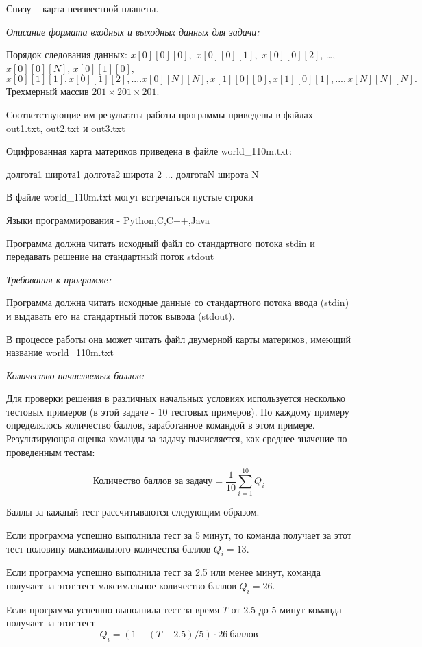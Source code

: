 Снизу -- карта неизвестной планеты.
 
\textit{Описание формата входных и выходных данных для задачи:}

Порядок следования данных: $x[0][0][0],$ $x[0][0][1],$ $x[0][0][2]$, \dots , $x[0][0][N]$, $x[0][1][0],$ \linebreak $x[0][1][1], x[0][1][2], .... x[0][N][N], x[1][0][0], x[1][0][1], ... , x[N][N][N].$ Трехмерный массив $201\times 201\times 201$.

Соответствующие им результаты работы программы приведены в файлах out1.txt, out2.txt и out3.txt

Оцифрованная карта материков приведена в файле world\_110m.txt:

долгота1 широта1
долгота2 широта 2
...
долготаN широта N

В файле world\_110m.txt могут встречаться пустые строки

Языки программирования - Python,C,C++,Java

Программа должна читать исходный файл со стандартного потока stdin и передавать решение на стандартный поток stdout

\textit{Требования к программе:}

    Программа должна читать исходные данные со стандартного потока ввода (stdin) и выдавать его на стандартный поток вывода (stdout).
    
В процессе работы она может читать файл двумерной карты материков, имеющий название world\_110m.txt 

\textit{Количество начисляемых баллов:}

Для проверки решения в различных начальных условиях используется несколько тестовых примеров (в этой задаче - 10 тестовых примеров). По каждому примеру определялось количество баллов, заработанное командой в этом примере. Результирующая оценка команды за задачу вычисляется, как среднее значение по проведенным тестам:

$$\text{Количество баллов за задачу} = \frac{1}{10} \sum_{i = 1}^{10} Q_i$$

Баллы за каждый тест рассчитываются следующим образом.

Если программа успешно выполнила тест за 5 минут, то команда получает за этот тест половину максимального количества баллов $Q_i = 13$.

Если программа успешно выполнила тест за 2.5 или менее минут, команда получает  за этот тест максимальное количество баллов $Q_i = 26$.

Если программа успешно выполнила тест за время $T$ от 2.5 до 5 минут команда получает   за этот тест
$$ Q_i=(1-(T-2.5)/5) \cdot 26 \: \text{баллов}$$

